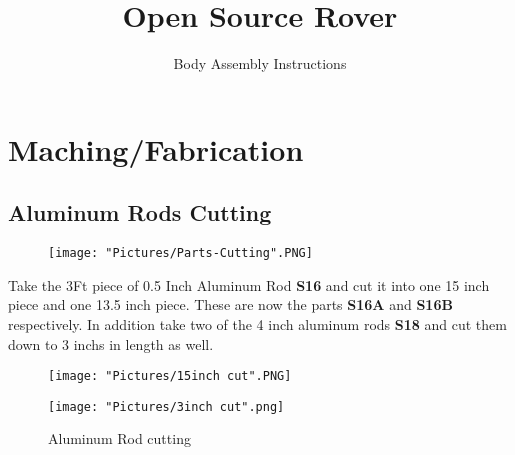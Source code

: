 \documentclass[12pt]{article}
\begin{document}
\title{Open Source Rover}
\author{Body Assembly Instructions}

\makeatletter         
\def\@maketitle{
\begin{center}	
	\makebox[\textwidth][c]{ \texttt{[image: "Pictures/Differential Pivot".png]}}
	{\Huge \bfseries \sffamily \@title }\\[4ex] 
	{\huge \bfseries \sffamily \@author}\\[4ex] 
	\texttt{[image: "Pictures/JPL logo".png]}
\end{center}}
\makeatother

\maketitle

\newpage


\tableofcontents

\newpage


\section{Maching/Fabrication}
\subsection{Aluminum Rods Cutting}

\begin{figure}[H]
	\centering
	\texttt{[image: "Pictures/Parts-Cutting".PNG]}
\end{figure}


Take the 3Ft piece of 0.5 Inch Aluminum Rod \textbf{S16} and cut it into one 15 inch piece and one 13.5 inch piece. These are now the parts \textbf{S16A} and \textbf{S16B} respectively. In addition take two of the 4 inch aluminum rods \textbf{S18} and cut them down to 3 inchs in length as well.  

\begin{figure}[H]
  \centering
  \begin{minipage}[b]{0.45\textwidth}
    \texttt{[image: "Pictures/15inch cut".PNG]}
  \end{minipage}
  \hfill
  \begin{minipage}[b]{0.45\textwidth}
    \texttt{[image: "Pictures/3inch cut".png]}
  \end{minipage}
  \caption{Aluminum Rod cutting}
  \label{Al dimensions}
\end{figure}
\end{document}
